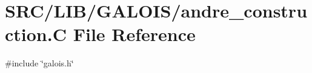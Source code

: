\hypertarget{andre__construction_8_c}{}\section{S\+R\+C/\+L\+I\+B/\+G\+A\+L\+O\+I\+S/andre\+\_\+construction.C File Reference}
\label{andre__construction_8_c}
{\ttfamily \#include \char`\"{}galois.\+h\char`\"{}}\newline
